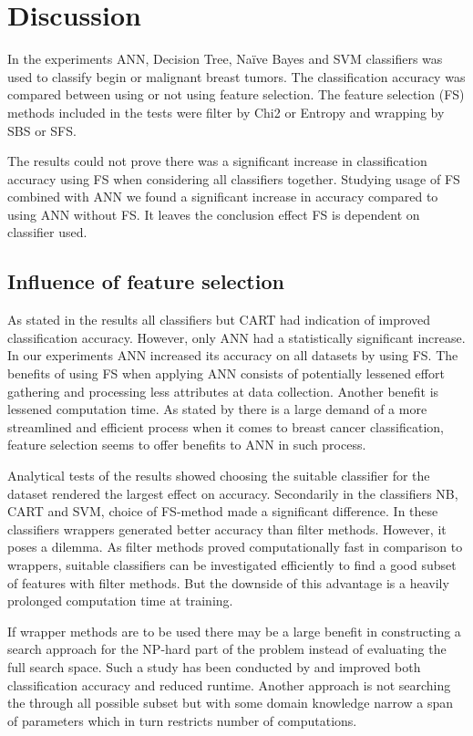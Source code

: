 \chapter{Discussion}

In the experiments ANN, Decision Tree, Na\"ive Bayes and SVM classifiers was used to classify begin or malignant breast tumors. The classification accuracy was compared between using or not using feature selection. The feature selection (FS) methods included in the tests were filter by Chi2 or Entropy and wrapping by SBS or SFS.

The results could not prove there was a significant increase in classification accuracy using FS when considering all classifiers together. Studying usage of FS combined with ANN we found a significant increase in accuracy compared to using ANN without FS. It leaves the conclusion effect FS is dependent on classifier used.

\section{Influence of feature selection}

As stated in the results all classifiers but CART had indication of improved classification accuracy. However, only ANN had a statistically significant increase. In our experiments ANN increased its accuracy on all datasets by using FS. The benefits of using FS when applying ANN consists of potentially lessened effort gathering and processing less attributes at data collection. Another benefit is lessened computation time. As stated by \textcite{martei2018} there is a large demand of a more streamlined and efficient process when it comes to breast cancer classification, feature selection seems to offer benefits to ANN in such process.

Analytical tests of the results showed choosing the suitable classifier for the dataset rendered the largest effect on accuracy. Secondarily in the classifiers NB, CART and SVM, choice of FS-method made a significant difference. In these classifiers wrappers generated better accuracy than filter methods. However, it poses a dilemma. As filter methods proved computationally fast in comparison to wrappers, suitable classifiers can be investigated efficiently to find a good subset of features with filter methods. But the downside of this advantage is a heavily prolonged computation time at training.

If wrapper methods are to be used there may be a large benefit in constructing a search approach for the NP-hard part of the problem instead of evaluating the full search space. Such a study has been conducted by \textcite{panthong2015} and improved both classification accuracy and reduced runtime. Another approach is not searching the through all possible subset but with some domain knowledge narrow a span of parameters which in turn restricts number of computations.

